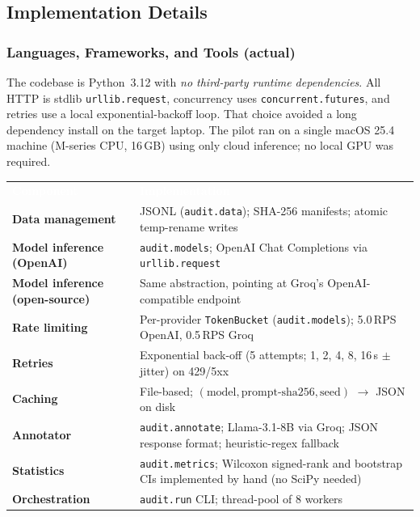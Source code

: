 \documentclass[11pt,a4paper]{article}
\begin{document}
\subsection{Implementation Details}

\subsubsection{Languages, Frameworks, and Tools (actual)}

The codebase is Python~3.12 with \emph{no third-party runtime dependencies}. All HTTP is stdlib \texttt{urllib.request}, concurrency uses \texttt{concurrent.futures}, and retries use a local exponential-backoff loop. That choice avoided a long dependency install on the target laptop. The pilot ran on a single macOS 25.4 machine (M-series CPU, 16\,GB) using only cloud inference; no local GPU was required.

\begin{center}
\renewcommand{\arraystretch}{1.3}
\begin{tabularx}{0.96\linewidth}{>{\bfseries\small}p{3.8cm} >{\small}X}
\rowcolor{rowblue}
\textcolor{white}{\textbf{Component}} & \textcolor{white}{\textbf{Implementation}}\\
\rowcolor{rowalt}
Data management & JSONL (\texttt{audit.data}); SHA-256 manifests; atomic temp-rename writes\\
Model inference (OpenAI) & \texttt{audit.models}; OpenAI Chat Completions via \texttt{urllib.request}\\
\rowcolor{rowalt}
Model inference (open-source) & Same abstraction, pointing at Groq's OpenAI-compatible endpoint\\
Rate limiting & Per-provider \texttt{TokenBucket} (\texttt{audit.models}); 5.0\,RPS OpenAI, 0.5\,RPS Groq\\
\rowcolor{rowalt}
Retries & Exponential back-off (5 attempts; 1, 2, 4, 8, 16\,s $\pm$ jitter) on 429/5xx\\
Caching & File-based; $(\text{model}, \text{prompt-sha256}, \text{seed})$ $\rightarrow$ JSON on disk\\
\rowcolor{rowalt}
Annotator & \texttt{audit.annotate}; Llama-3.1-8B via Groq; JSON response format; heuristic-regex fallback\\
Statistics & \texttt{audit.metrics}; Wilcoxon signed-rank and bootstrap CIs implemented by hand (no SciPy needed)\\
\rowcolor{rowalt}
Orchestration & \texttt{audit.run} CLI; thread-pool of 8 workers\\
\end{tabularx}
\end{center}
\end{document}
